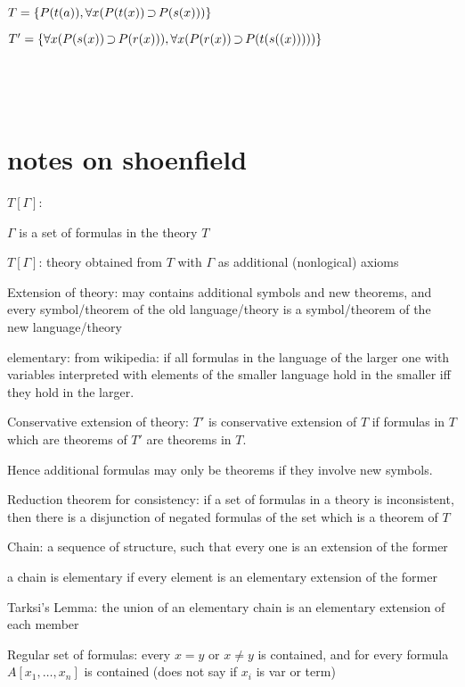 $T = \{ P(t(a)), \forall x (P(t(x)) \operatorname{\supset} P(s(x))) \}$

$T' = \{  \forall x (P(s(x)) \operatorname{\supset} P(r(x))) ,
\forall x (P(r(x)) \operatorname{\supset} P(t(s((x))))) \}$


~

~




\section{notes on shoenfield}



\begin{description}
	\item{$T[\Gamma]$:}

$\Gamma$ is a set of formulas in the theory $T$

$T[\Gamma]$: theory obtained from $T$ with $\Gamma$ as additional (nonlogical) axioms


	\item{Extension of theory:}
		may contains additional symbols and new theorems, and every symbol/theorem of the old language/theory is a symbol/theorem of the new language/theory

		elementary: from wikipedia: if all formulas in the language of the larger one with variables interpreted with elements of the smaller language hold in the smaller iff they hold in the larger.

	\item{Conservative extension of theory:}
		$T'$ is conservative extension of $T$ if formulas in $T$ which are theorems of $T'$ are theorems in $T$.

		Hence additional formulas may only be theorems if they involve new symbols.

	\item{Reduction theorem for consistency:}
		if a set of formulas in a theory is inconsistent, then there is a disjunction of negated formulas of the set which is a theorem of $T$

	\item{Chain:}
		a sequence of structure, such that every one is an extension of the former

		a chain is elementary if every element is an elementary extension of the former

	\item{Tarksi's Lemma:}
		the union of an elementary chain is an elementary extension of each member

	\item{Regular set of formulas:} 
		every $x=y$ or $x\neq y$ is contained, and for every formula $A[x_1, \dots, x_n]$ is contained (does not say if $x_i$ is var or term)

\end{description}

